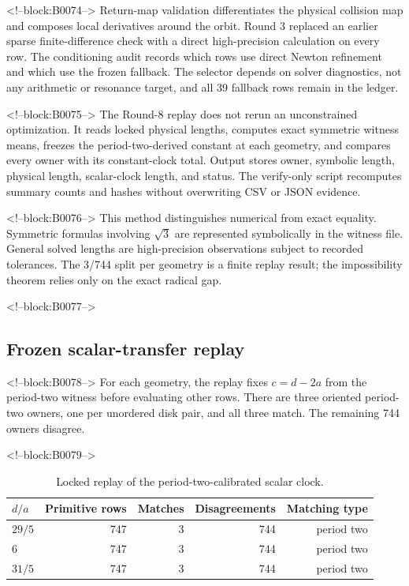 \documentclass[11pt,a4paper]{article}
\theoremstyle{definition}
\theoremstyle{remark}
\begin{document}
<!--block:B0074-->
Return-map validation differentiates the physical collision map and composes local derivatives around the orbit. Round 3 replaced an earlier sparse finite-difference check with a direct high-precision calculation on every row. The conditioning audit records which rows use direct Newton refinement and which use the frozen fallback. The selector depends on solver diagnostics, not any arithmetic or resonance target, and all 39 fallback rows remain in the ledger.

<!--block:B0075-->
The Round-8 replay does not rerun an unconstrained optimization. It reads locked physical lengths, computes exact symmetric witness means, freezes the period-two-derived constant at each geometry, and compares every owner with its constant-clock total. Output stores owner, symbolic length, physical length, scalar-clock length, and status. The verify-only script recomputes summary counts and hashes without overwriting CSV or JSON evidence.

<!--block:B0076-->
This method distinguishes numerical from exact equality. Symmetric formulas involving \(\sqrt3\) are represented symbolically in the witness file. General solved lengths are high-precision observations subject to recorded tolerances. The 3/744 split per geometry is a finite replay result; the impossibility theorem relies only on the exact radical gap.

<!--block:B0077-->
\subsection{Frozen scalar-transfer replay}

<!--block:B0078-->
For each geometry, the replay fixes \(c=d-2a\) from the period-two witness before evaluating other rows. There are three oriented period-two owners, one per unordered disk pair, and all three match. The remaining 744 owners disagree.

<!--block:B0079-->
\begin{table}[t]
\centering
\caption{Locked replay of the period-two-calibrated scalar clock.}
\label{tab:replay}
\begin{tabular}{lrrrr}
\toprule
\(d/a\) & Primitive rows & Matches & Disagreements & Matching type \\
\midrule
\(29/5\) & 747 & 3 & 744 & period two \\
\(6\) & 747 & 3 & 744 & period two \\
\(31/5\) & 747 & 3 & 744 & period two \\
\bottomrule
\end{tabular}
\end{table}
\end{document}
